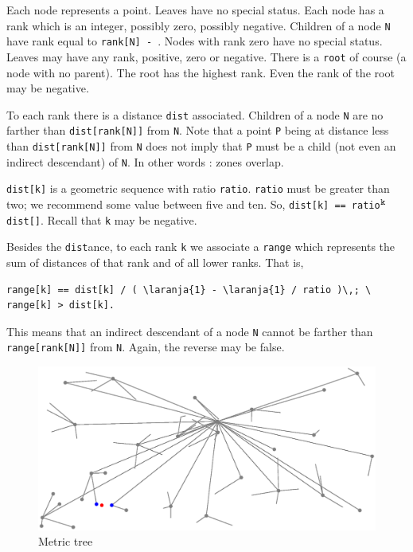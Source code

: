 Each node represents a point.
Leaves have no special status.
Each node has a rank which is an integer, possibly zero, possibly negative.
Children of a node {\small\tt N} have rank equal to {\small\tt rank[N] - }.
Nodes with rank zero have no special status.
Leaves may have any rank, positive, zero or negative.
There is a {\small\tt root} of course (a node with no parent).
The root has the highest rank.
Even the rank of the root may be negative.

To each rank there is a distance {\small\tt dist} associated.
Children of a node {\small\tt N} are no farther than {\small\tt dist[rank[N]]} from {\small\tt N}.
Note that a point {\small\tt P} being at distance less than {\small\tt dist[rank[N]]} from
{\small\tt N} does not imply that {\small\tt P} must be a child (not even an indirect descendant)
of {\small\tt N}.
In other words : zones overlap.

{\small\tt dist[k]} is a geometric sequence with ratio {\small\tt ratio}.
{\small\tt ratio} must be greater than two; we recommend some value between five and ten.
So, {\small\tt dist[k] == ratio}$^{\hbox{\footnotesize\tt k }}${\small\tt dist[]}.
Recall that {\small\tt k} may be negative.

Besides the {\small\tt dist}ance, to each rank {\small\tt k} we associate a {\small\tt range}
which represents the sum of distances of that rank and of all lower ranks.
That is,
\begin{Verbatim}[commandchars=\\\{\},formatcom=\small\tt,baselinestretch=0.94]
   range[k] == dist[k] / ( \laranja{1} - \laranja{1} / ratio )\,; \ range[k] > dist[k].
\end{Verbatim}
\noindent This means that an indirect descendant of a node {\small\tt N} cannot be farther than
{\small\tt range[rank[N]]} from {\small\tt N}.
Again, the reverse may be false.

\begin{figure}[ht] \centering
  \includegraphics[width=120mm]{metric-tree}
  \caption{Metric tree}
  \label{\numb section 12.\numb fig 9}
\end{figure}

